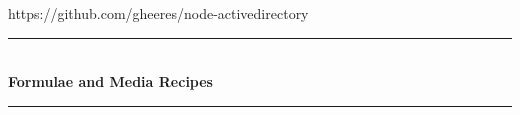 \documentclass[idxtotoc,hyperref,openany]{labbook} %
\newcommand{\HRule}{\rule{\linewidth}{0.5mm}} %
\begin{document}
https://github.com/gheeres/node-activedirectory



\labday{} %

\begin{center}
\HRule \\[0.4cm]
{\huge \textbf{Formulae and Media Recipes}}\\[0.4cm] %
\HRule \\[1.5cm]
\end{center}


\newpage





\newpage




\end{document}
